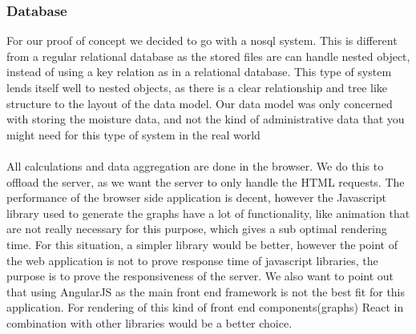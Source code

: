 \documentclass[]{uiophd}
\begin{document}
\subsubsection{Database}
For our proof of concept we decided to go with a nosql system. This is different from a regular relational database as the stored files are can handle nested object, instead of using a key relation as in a relational database. This type of system lends itself well to nested objects, as there is a clear relationship and tree like structure to the layout of the data model. Our data model was only concerned with storing the moisture data, and not the kind of administrative data that you might need for this type of system in the real world
\\\\
All calculations and data aggregation are done in the browser. We do this to offload the server, as we want the server to only handle the HTML requests. The performance of the browser side application is decent, however the Javascript library used to generate the graphs have a lot of functionality, like animation that are not really necessary for this purpose, which gives a sub optimal rendering time. For this situation, a simpler library would be better, however the point of the web application is not to prove response time of javascript libraries, the purpose is to prove the responsiveness of the server. We also want to point out that using AngularJS as the main front end framework is not the best fit for this application. For rendering of this kind of front end components(graphs) React in combination with other libraries would be a better choice. 
\end{document}
